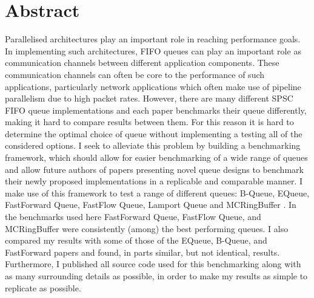 \section*{Abstract}
Parallelised architectures play an important role in reaching performance goals.
In implementing such architectures, FIFO queues can play an important role as communication channels between different application components.
These communication channels can often be core to the performance of such applications, particularly network applications which often make use of pipeline parallelism due to high packet rates.
However, there are many different SPSC FIFO queue implementations and each paper benchmarks their queue differently, making it hard to compare results between them.
For this reason it is hard to determine the optimal choice of queue without implementing a testing all of the considered options.
I seek to alleviate this problem by building a benchmarking framework, which should allow for easier benchmarking of a wide range of queues and allow future authors of papers presenting novel queue designs to benchmark their newly proposed implementations in a replicable and comparable manner.
I make use of this framework to test a range of different queues: B-Queue, EQueue, FastForward Queue, FastFlow Queue, Lamport Queue and MCRingBuffer \cite{B-Queue,EQueue,FastForward,FastFlowGithub,Lamport,MCRingBuffer}.
In the benchmarks used here FastForward Queue, FastFlow Queue, and MCRingBuffer were consistently (among) the best performing queues.
I also compared my results with some of those of the EQueue, B-Queue, and FastForward papers and found, in parts similar, but not identical, results.
Furthermore, I published all source code used for this benchmarking along with as many surrounding details as possible, in order to make my results as simple to replicate as possible.
